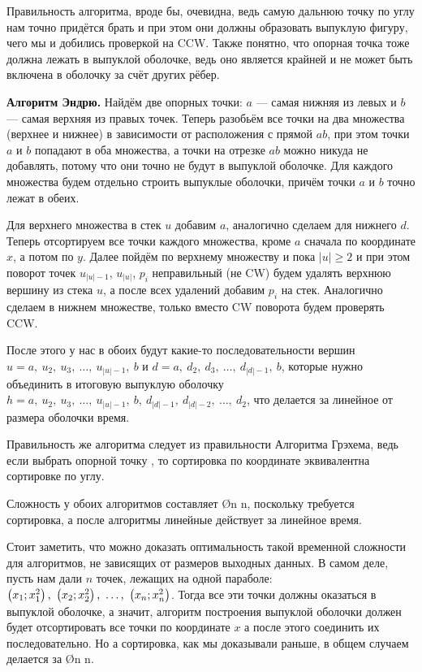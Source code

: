 Правильность алгоритма, вроде бы, очевидна, ведь самую дальнюю точку по углу нам точно придётся брать и при этом они должны образовать выпуклую фигуру, чего мы и добились проверкой на CCW. Также понятно, что опорная точка тоже должна лежать в выпуклой оболочке, ведь оно является крайней и не может быть включена в оболочку за счёт других рёбер.

\textbf{Алгоритм Эндрю.} Найдём две опорных точки: $a$ — самая нижняя из левых и $b$ — самая верхняя из правых точек. Теперь разобьём все точки на два множества (верхнее и нижнее) в зависимости от расположения с прямой $ab$, при этом точки $a$ и $b$ попадают в оба множества, а точки на отрезке $ab$ можно никуда не добавлять, потому что они точно не будут в выпуклой оболочке. Для каждого множества будем отдельно строить выпуклые оболочки, причём точки $a$ и $b$ точно лежат в обеих.

Для верхнего множества в стек $u$ добавим $a$, аналогично сделаем для нижнего $d$. Теперь отсортируем все точки каждого множества, кроме $a$ сначала по координате $x$, а потом по $y$. Далее пойдём по верхнему множеству и пока $|u| \geq 2$ и при этом поворот точек $u_{|u| - 1}$, $u_{|u|}$, $p_i$ неправильный (не CW) будем удалять верхнюю вершину из стека $u$, а после всех удалений добавим $p_i$ на стек. Аналогично сделаем в нижнем множестве, только вместо CW поворота будем проверять CCW. 

После этого у нас в обоих будут какие-то последовательности вершин $u = a,\ u_2,\ u_3,\ \ldots,\ u_{|u| - 1},\ b$ и $d = a,\ d_2,\ d_3,\ \ldots,\ d_{|d| - 1},\ b$, которые нужно объединить в итоговую выпуклую оболочку $h = a,\ u_2,\ u_3,\ \ldots,\ u_{|u| - 1},\ b,\ d_{|d| - 1}, \ d_{|d| - 2},\ \ldots,\ d_2$, что делается за линейное от размера оболочки время.

Правильность же алгоритма следует из правильности Алгоритма Грэхема, ведь если выбрать опорной точку , то сортировка по координате эквивалентна сортировке по углу.

Сложность у обоих алгоритмов составляет \O{n \log n}, поскольку требуется сортировка, а после алгоритмы линейные действует за линейное время.

Стоит заметить, что можно доказать оптимальность такой временной сложности для алгоритмов, не зависящих от размеров выходных данных. В самом деле, пусть нам дали $n$ точек, лежащих на одной параболе: $\pmath{x_1}{x_1^2},\ \pmath{x_2}{x_2^2},\ \ldots,\ \pmath{x_n}{x_n^2}$. Тогда все эти точки должны оказаться в выпуклой оболочке, а значит, алгоритм построения выпуклой оболочки должен будет отсортировать все точки по координате $x$ а после этого соединить их последовательно. Но а сортировка, как мы доказывали раньше, в общем случаем делается за \O{n \log n}.

